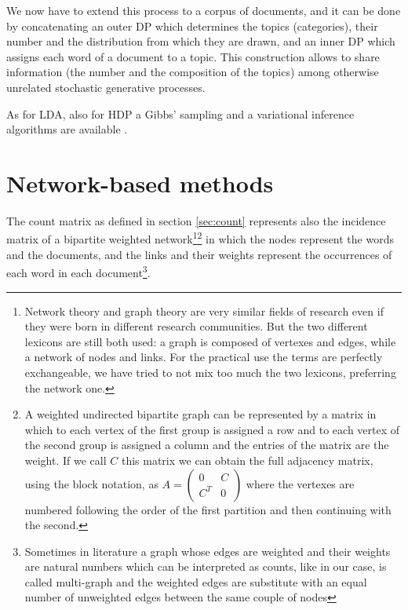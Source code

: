 \documentclass[11pt, a4paper, oneside, openright]{book}
\begin{document}
We now have to extend this process to a corpus of documents, and it can be done by concatenating an outer DP which determines the topics (categories), their number and the distribution from which they are drawn, and an inner DP which assigns each word of a document to a topic.
This construction allows to share information (the number and the composition of the topics) among otherwise unrelated stochastic generative processes.

As for LDA, also for HDP a Gibbs' sampling and a variational inference algorithms are available \parencite{teh2005,wang2011,newman2009}.

\chapter{Network-based methods}
\label{ch:net}
The count matrix as defined in section \ref{sec:count} represents also the incidence matrix of a bipartite weighted network\footnote{Network theory and graph theory are very similar fields of research even if they were born in different research communities. But the two different lexicons are still both used: a graph is composed of vertexes and edges, while a network of nodes and links. For the practical use the terms are perfectly exchangeable, we have tried to not mix too much the two lexicons, preferring the network one.}\footnote{\label{fn:adj}A weighted undirected bipartite graph can be represented by a matrix in which to each vertex of the first group is assigned a row and to each vertex of the second group is assigned a column and the entries of the matrix are the weight. If we call $C$ this matrix we can obtain the full adjacency matrix, using the block notation, as $A = \left(
	\begin{array}{cc}
		0 & C \\ C^T & 0
	\end{array}
\right)$ where the vertexes are numbered following the order of the first partition and then continuing with the second.} in which the nodes represent the words and the documents, and the links and their weights represent the occurrences of each word in each document\footnote{Sometimes in literature a graph whose edges are weighted and their weights are natural numbers which can be interpreted as counts, like in our case, is called multi-graph and the weighted edges are substitute with an equal number of unweighted edges between the same couple of nodes}.
\end{document}
